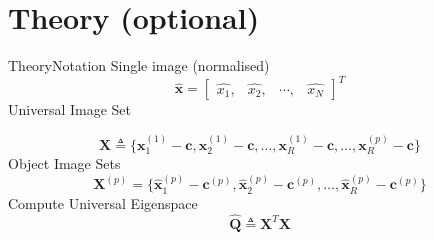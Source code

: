 \documentclass[aspectratio=169, handout, 10pt, hyperref=colorlinks]{beamer}
\begin{document}
\section{Theory (optional)}
\begin{frame}[allowframebreaks]{Theory}{Notation}
Single image (normalised)
\begin{equation}
            \hat{\mathbf{x}} = 
        \begin{bmatrix}
        \hat{x_1}, & \hat{x_2}, & \cdots, & \hat{x_N}
        \end{bmatrix}^T
    \end{equation}
Universal Image Set
    
    \begin{equation}
        \mathbf{X} \triangleq \{ \mathbf{x}^{(1)}_{1} - \mathbf{c}, \mathbf{x}^{(1)}_{2} - \mathbf{c}, \dots, \mathbf{x}^{(1)}_{R} - \mathbf{c}, \dots, \mathbf{x}^{(p)}_{R} - \mathbf{c}\}
    \end{equation}
Object Image Sets
    \begin{equation}
        \mathbf{X}^{(p)} = \{ \hat{\mathbf{x}}^{(p)}_{1} - \mathbf{c}^{(p)}, \hat{\mathbf{x}}^{(p)}_{2} - \mathbf{c}^{(p)}, \dots, \hat{\mathbf{x}}^{(p)}_{R} -  \mathbf{c}^{(p)}\}
    \end{equation}
Compute Universal Eigenspace
    \begin{equation}
       \mathbf{\hat{Q}} \triangleq \mathbf{X}^T\mathbf{X}
    \end{equation}


\end{frame}
\end{document}
